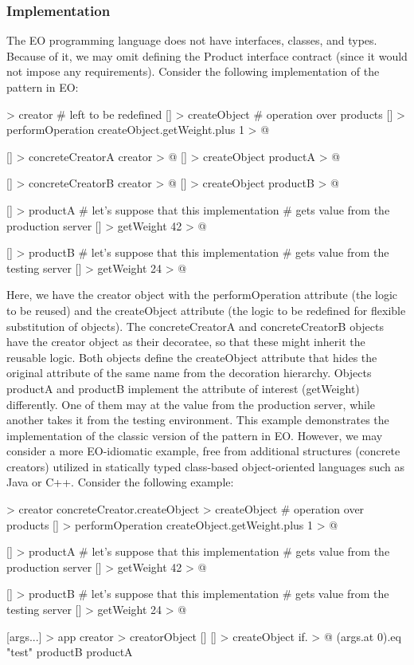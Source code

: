 \documentclass[12pt]{book}
\begin{document}
\subsubsection{Implementation}
The EO programming language does not have interfaces, classes, and types. Because of it, we may omit defining the Product interface contract (since it would not impose any requirements). Consider the following implementation of the pattern in EO: 

\begin{ffcode}
[] > creator
  # left to be redefined
  [] > createObject
  # operation over products
  [] > performOperation
    createObject.getWeight.plus 1 > @

[] > concreteCreatorA
  creator > @
  [] > createObject
    productA > @

[] > concreteCreatorB
  creator > @
  [] > createObject
    productB > @

[] > productA
  # let's suppose that this implementation
  # gets value from the production server
  [] > getWeight
    42 > @

[] > productB
  # let's suppose that this implementation
  # gets value from the testing server
  [] > getWeight
          24 > @

\end{ffcode}

Here, we have the creator object with the performOperation attribute (the logic to be reused) and the createObject attribute (the logic to be redefined for flexible substitution of objects). The concreteCreatorA and concreteCreatorB objects have the creator object as their decoratee, so that these might inherit the reusable logic. Both objects define the createObject attribute that hides the original attribute of the same name from the decoration hierarchy. Objects productA and productB implement the attribute of interest (getWeight) differently. One of them may at the value from the production server, while another takes it from the testing environment. This example demonstrates the implementation of the classic version of the pattern in EO. However, we may consider a more EO-idiomatic example, free from additional structures (concrete creators) utilized in statically typed class-based object-oriented languages such as Java or C++. Consider the following example: 

\begin{ffcode}
[concreteCreator] > creator
  concreteCreator.createObject > createObject
  # operation over products
  [] > performOperation
    createObject.getWeight.plus 1 > @

[] > productA
  # let's suppose that this implementation
  # gets value from the production server
  [] > getWeight
    42 > @

[] > productB
  # let's suppose that this implementation
  # gets value from the testing server
  [] > getWeight
    24 > @

[args...] > app
  creator > creatorObject
    []
      [] > createObject
        if. > @
          (args.at 0).eq "test"
          productB
          productA

\end{ffcode}
\end{document}
